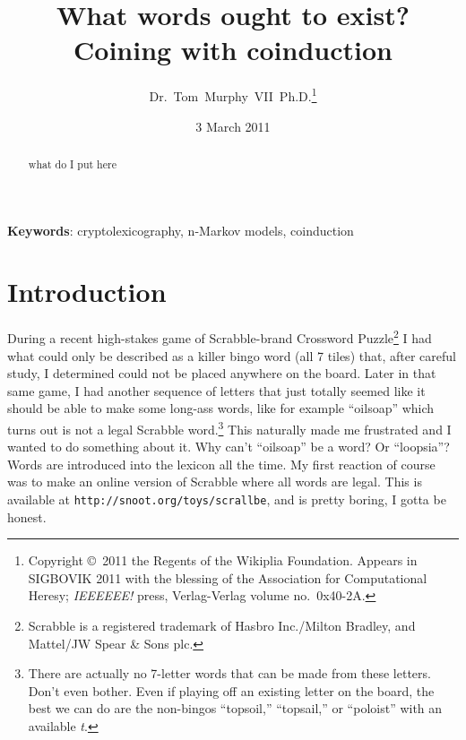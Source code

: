 \documentclass[twocolumn]{article}
\begin{document}
 

\title{What words ought to exist? \\
       {\normalsize Coining with coinduction}}
\author{Dr.~Tom~Murphy~VII~Ph.D.\thanks{
Copyright \copyright\ 2011 the Regents of the Wikiplia
Foundation. Appears in SIGBOVIK 2011 with the blessing of the
Association for Computational Heresy; {\em IEEEEEE!} press,
Verlag-Verlag volume no.~0x40-2A.
}
}


\renewcommand\>{$>$}
\newcommand\<{$<$}

\date{3 March 2011}

\maketitle

\begin{abstract}
what do I put here
\end{abstract}

\vspace{1em}
{\noindent \small {\bf Keywords}:
 cryptolexicography, n-Markov models, coinduction
}

\section*{Introduction}
During a recent high-stakes game of Scrabble-brand Crossword
Puzzle\footnote{Scrabble is a registered trademark of Hasbro
Inc./Milton Bradley, and Mattel/JW Spear \& Sons plc.} I had what
could only be described as a killer bingo word (all 7 tiles) that,
after careful study, I determined could not be placed anywhere on the
board. Later in that same game, I had another sequence of letters that
just totally seemed like it should be able to make some long-ass
words, like for example ``oilsoap'' which turns out is not a legal
Scrabble word.\!\footnote{There are actually no 7-letter words that
can be made from these letters. Don't even bother. Even if playing off
an existing letter on the board, the best we can do are the non-bingos
``topsoil,'' ``topsail,'' or ``poloist'' with an available {\it t}.}
This naturally made me frustrated and I wanted to do something about
it. Why can't ``oilsoap'' be a word? Or ``loopsia''? Words are
introduced into the lexicon all the time. My first reaction of course
was to make an online version of Scrabble where all words are legal.
This is available at {\tt http://snoot.org/toys/scrallbe}, and is
pretty boring, I gotta be honest.
\end{document}
